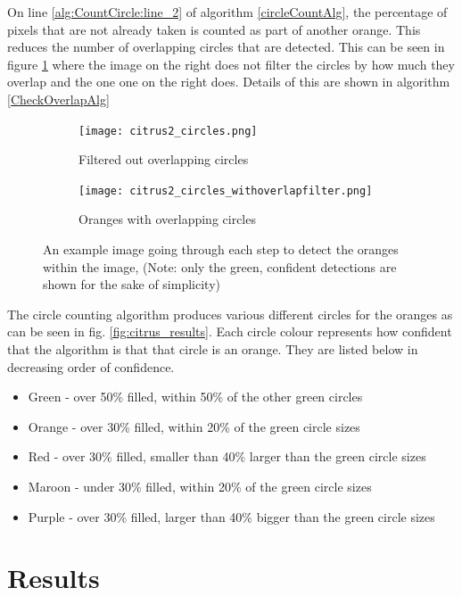 \documentclass[conference]{IEEEtran}
\begin{document}
On line \ref{alg:CountCircle:line_2} of algorithm \ref{circleCountAlg}, the percentage of pixels that are not already taken is counted as part of another orange. This reduces the number of overlapping circles that are detected. This can be seen in figure \ref{overlapComp} where the image on the right does not filter the circles by how much they overlap and the one one on the right does. Details of this are shown in algorithm \ref{CheckOverlapAlg}


\begin{figure}[H]
  \begin{subfigure}{.49\linewidth}
   \texttt{[image: citrus2\_circles.png]}\hfill
   \caption{Filtered out overlapping circles}
  \end{subfigure}
  \begin{subfigure}{.49\linewidth}
    \texttt{[image: citrus2\_circles\_withoverlapfilter.png]}
    \caption{Oranges with overlapping circles}
  \end{subfigure}
  \caption{An example image going through each step to detect the oranges within the image, (Note: only the green, confident detections are shown for the sake of simplicity)} \label{overlapComp}
\end{figure}


The circle counting algorithm produces various different circles for the oranges as can be seen in fig. \ref{fig:citrus_results}. Each circle colour represents how confident that the algorithm is that that circle is an orange. They are listed below in decreasing order of confidence.

\begin{itemize}
\item Green - over 50\% filled, within 50\% of the other green circles
\item Orange - over 30\% filled, within 20\% of the green circle sizes
\item Red - over 30\% filled, smaller than 40\% larger than the green circle sizes
\item Maroon - under 30\% filled,  within 20\% of the green circle sizes
\item Purple - over 30\% filled, larger  than 40\% bigger than the green circle sizes
\end{itemize}


\section{Results}
\end{document}
